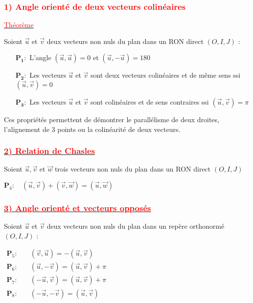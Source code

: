 \documentclass[a4paper,12pt]{article}
\begin{document}
\subsubsection*{\textcolor{red}{1) Angle orienté de deux vecteurs colinéaires}}

\underline{\textcolor{red}{Théorème}}

Soient \( \vec{u} \) et \( \vec{v} \) deux vecteurs non nuls du plan dans un RON direct \( (O, I, J) \) :

\begin{itemize}
    \item[\( \mathbf{P_1} :\)] L’angle \( (\vec{u}, \vec{u}) = 0 \) et \( (\vec{u}, -\vec{u}) = 180 \)
    \item[\( \mathbf{P_2} :\)] Les vecteurs \( \vec{u} \) et \( \vec{v} \) sont deux vecteurs colinéaires et de même sens ssi \( (\vec{u}, \vec{v}) = 0 \)
    \item[\( \mathbf{P_3} :\)] Les vecteurs \( \vec{u} \) et \( \vec{v} \) sont colinéaires et de sens contraires ssi \( (\vec{u}, \vec{v}) = \pi \)
\end{itemize}

Ces propriétés permettent de démontrer le parallélisme de deux droites, l’alignement de 3 points ou la colinéarité de deux vecteurs.

\subsubsection*{\underline{\textcolor{red}{2) Relation de Chasles}}}

Soient \( \vec{u}, \vec{v} \) et \( \vec{w} \) trois vecteurs non nuls du plan dans un RON direct \( (O, I, J) \)

\( \textbf{P}_4: \quad (\vec{u}, \vec{v}) + (\vec{v}, \vec{w}) = (\vec{u}, \vec{w}) \)

\subsubsection*{\underline{\textcolor{red}{3) Angle orienté et vecteurs opposés}}}

Soient \( \vec{u} \) et \( \vec{v} \) deux vecteurs non nuls du plan dans un repère orthonormé \( (O, I, J) \) :

\(
\begin{aligned}
    \textbf{P}_5: \quad & (\vec{v}, \vec{u}) = -(\vec{u}, \vec{v})       \\
    \textbf{P}_6: \quad & (\vec{u}, -\vec{v}) = (\vec{u}, \vec{v}) + \pi \\
    \textbf{P}_7: \quad & (-\vec{u}, \vec{v}) = (\vec{u}, \vec{v}) + \pi \\
    \textbf{P}_8: \quad & (-\vec{u}, -\vec{v}) = (\vec{u}, \vec{v})
\end{aligned}
\)
\end{document}
